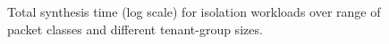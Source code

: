 \begin{figure}
	\centering
	\caption{\label{fig:isolation}
		Total synthesis time (log scale) for isolation workloads over range of packet classes and different tenant-group sizes.}
\end{figure}




